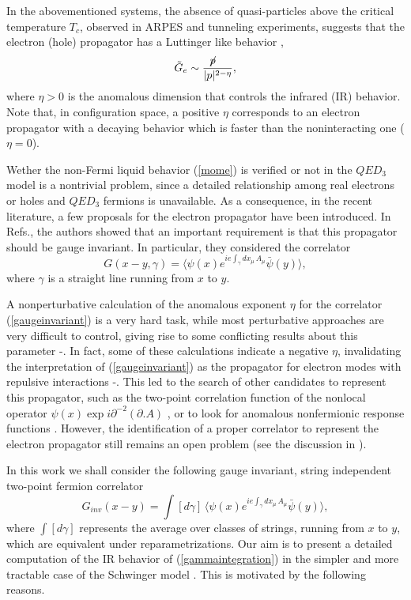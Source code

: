 \documentclass[a4paper,12pt]{article}
\begin{document}
In the abovementioned systems, the absence of quasi-particles above the critical temperature $T_c$, observed in ARPES and tunneling experiments, suggests that the electron (hole) propagator has a Luttinger like behavior \cite{rw1},
\begin{equation}
\tilde{G}_{e}\sim \frac{\not\! p~~~}{|p|^{2-\eta}},
\label{mome}
\end{equation}
where $\eta > 0 $ is the anomalous dimension that controls the infrared (IR) behavior. Note that, in configuration space, a positive $\eta$ corresponds to an electron propagator with a decaying behavior which is faster than the noninteracting one ($\eta=0$). 

Wether the non-Fermi liquid behavior (\ref{mome}) is verified or not in the $QED_3$ model is  a nontrivial problem, since a detailed relationship among real electrons or holes and $QED_3$ fermions is unavailable. As a consequence, in the recent literature, a few proposals for the electron propagator have been introduced. In Refs.\cite{rw1,rw2}, the authors showed that an important requirement is that this propagator should be gauge invariant. In particular, they 
considered the correlator
\begin{equation}
G(x-y,\gamma)=\langle \psi(x)e^{ie\int_\gamma dx_\mu\, A_\mu} \bar{\psi}(y) \rangle, 
\label{gaugeinvariant}
\end{equation}
where $\gamma$ is a straight line running from $x$ to $y$.

A nonperturbative calculation of the anomalous exponent $\eta$ for the correlator (\ref{gaugeinvariant}) is a very hard task, while most perturbative approaches are very difficult to control, giving rise to some conflicting results about this parameter \cite{rw1}-\cite{gkr}. In fact, some of these calculations indicate a negative $\eta$, invalidating the interpretation of (\ref{gaugeinvariant}) as the propagator for electron modes with repulsive interactions \cite{rw2}-\cite{gkr}. This led to the search of other candidates to represent this propagator, such as the two-point correlation function of the nonlocal operator $\psi(x)\exp {i\partial^{-2} (\partial .A)}$ \cite{k1}, or to look for anomalous nonfermionic response functions \cite{fpst}. However, the identification of a proper correlator to represent the electron propagator still remains an open problem (see the discussion in \cite{gkr}).

In this work we shall consider the following gauge invariant, string independent two-point fermion correlator 
\begin{equation}
G_{inv}(x-y)=\int [d\gamma]\, \langle \psi(x)e^{ie\int_\gamma dx_\mu\, A_\mu} \bar{\psi}(y) \rangle,
\label{gammaintegration}
\end{equation}
where $\int[d\gamma]$ represents the average over classes of strings, running from $x$ to $y$, which are equivalent under reparametrizations. Our aim is to present a detailed computation of the IR behavior of (\ref{gammaintegration}) in the simpler and more tractable case of the Schwinger model \cite{sch}. This is motivated by the following reasons. 
\end{document}
